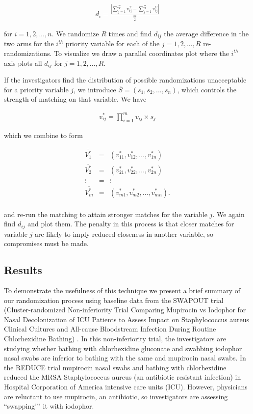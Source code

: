 \documentclass[]{sagej}
\begin{document}
\begin{eqnarray*}
 d_i = \frac{| \sum_{j = 1}^{\frac{m}{2}}v_{ij}^T - \sum_{j = 1}^{\frac{m}{2}}v_{ij}^C |}{\frac{m}{2}} 
\end{eqnarray*}

for \(i = 1, 2, ..., n.\) We randomize \(R\) times and find \(d_{ij}\)
the average difference in the two arms for the \(i^{th}\) priority
variable for each of the \(j = 1, 2, ..., R\) re-randomizations. To
visualize we draw a parallel coordinates plot where the \(i^{th}\) axis
plots all \(d_{ij}\) for \(j = 1, 2, ..., R.\)

If the investigators find the distribution of possible randomizations
unacceptable for a priority variable \(j\), we introduce
\(\overline{S} = (s_{1}, s_{2},..., s_{n})\), which controls the
strength of matching on that variable. We have

\begin{eqnarray*}
 v_{ij}^* = \prod_{i=1}^{m} v_{ij} \times s_j
\end{eqnarray*}

which we combine to form

\begin{eqnarray*}
 \overline{V_1^*} & = & (v_{11}^*, v_{12}^*,..., v_{1n}^*) \\
 \overline{V_2^*} & = & (v_{21}^*, v_{22}^*,..., v_{2n}^*) \\
 \vdots & = & \vdots\\    
 \overline{V_m^*} & = & (v_{m1}^*, v_{m2}^*,..., v_{mn}^*) .\\
\end{eqnarray*}

and re-run the matching to attain stronger matches for the variable
\(j\). We again find \(d_{ij}\) and plot them. The penalty in this
process is that closer matches for variable \(j\) are likely to imply
reduced closeness in another variable, so compromises must be made.

\subsection{Results}\label{results}

To demonstrate the usefulness of this technique we present a brief
summary of our randomization process using baseline data from the
SWAPOUT trial (Cluster-randomized Non-inferiority Trial Comparing
Mupirocin vs Iodophor for Nasal Decolonization of ICU Patients to Assess
Impact on Staphylococcus aureus Clinical Cultures and All-cause
Bloodstream Infection During Routine Chlorhexidine Bathing)
\citep{SOTrial}. In this non-inferiority trial, the investigators are
studying whether bathing with chlorhexidine gluconate and swabbing
iodophor nasal swabs are inferior to bathing with the same and mupirocin
nasal swabs. In the REDUCE trial \citep{huang2013targeted} mupirocin
nasal swabs and bathing with chlorhexidine reduced the MRSA
Staphylococcus aureus (an antibiotic resistant infection) in Hospital
Corporation of America intensive care units (ICU). However, physicians
are reluctant to use mupirocin, an antibiotic, so investigators are
assessing ``swapping''" it with iodophor.
\end{document}

